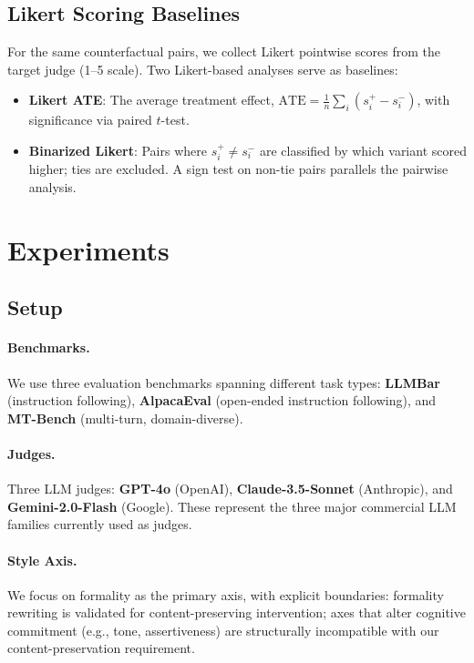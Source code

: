 \documentclass[11pt,a4paper]{article}
\begin{document}
\subsection{Likert Scoring Baselines}
\label{sec:likert_baselines}

For the same counterfactual pairs, we collect Likert pointwise scores from the target judge (1--5 scale).
Two Likert-based analyses serve as baselines:
\begin{itemize}
    \item \textbf{Likert ATE}: The average treatment effect, $\text{ATE} = \frac{1}{n}\sum_i (s_i^{+} - s_i^{-})$, with significance via paired $t$-test.
    \item \textbf{Binarized Likert}: Pairs where $s_i^{+} \neq s_i^{-}$ are classified by which variant scored higher; ties are excluded. A sign test on non-tie pairs parallels the pairwise analysis.
\end{itemize}

\section{Experiments}
\label{sec:experiments}

\subsection{Setup}
\label{sec:setup}

\paragraph{Benchmarks.} We use three evaluation benchmarks spanning different task types: \textbf{LLMBar} \cite{llmbar2024} (instruction following), \textbf{AlpacaEval} \cite{alpacaeval2024} (open-ended instruction following), and \textbf{MT-Bench} \cite{zheng2023judging} (multi-turn, domain-diverse).

\paragraph{Judges.} Three LLM judges: \textbf{GPT-4o} (OpenAI), \textbf{Claude-3.5-Sonnet} (Anthropic), and \textbf{Gemini-2.0-Flash} (Google).
These represent the three major commercial LLM families currently used as judges.

\paragraph{Style Axis.} We focus on formality as the primary axis, with explicit boundaries: formality rewriting is validated for content-preserving intervention; axes that alter cognitive commitment (e.g., tone, assertiveness) are structurally incompatible with our content-preservation requirement.
\end{document}

